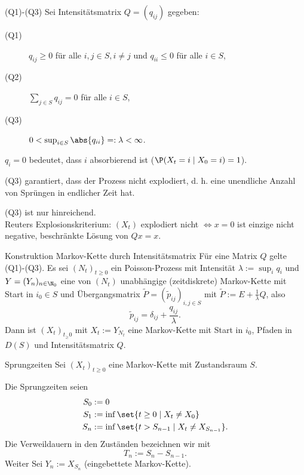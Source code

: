 \begin{karte}{(Q1)-(Q3)}
    Sei Intensitätsmatrix \( Q = (q_{ij}) \) gegeben:
    \begin{description}
        \item[(Q1)] \(q_{ij} \geq 0\) für alle \(i,j\in S,i\neq j\) 
        und \(q_{ii} \leq 0\) für alle \(i\in S\),
        \item[(Q2)] \(\sum_{j\in S} q_{ij} = 0\) für alle \(i\in S\),
        \item[(Q3)] \(0<\sup_{i\in S} \abs{q_{ii}} =: \lambda < \infty\). 
    \end{description}
    \(q_i = 0\) bedeutet, dass \(i\) absorbierend ist (\(\P(X_t = i \;|\;X_0 = i) = 1\)).

    (Q3) garantiert, dass der Prozess nicht explodiert, d. h. eine
    unendliche Anzahl von Sprüngen in endlicher Zeit hat.

    (Q3) ist nur hinreichend.\\
    Reuters Explosionskriterium: \((X_t)\) explodiert nicht 
    \(\Leftrightarrow x = 0\) ist einzige nicht negative, 
    beschränkte Lösung von \(Qx = x\).
\end{karte}

\begin{karte}{Konstruktion Markov-Kette durch Intensitätsmatrix}
    Für eine Matrix \(Q\) gelte (Q1)-(Q3). Es sei \((N_t)_{t\geq 0}\) 
    ein Poisson-Prozess mit Intensität \(\lambda := \sup_i q_i\) 
    und \(Y = (Y_n)_{n\in\N_0}\) eine von \((N_t)\) unabhängige 
    (zeitdiskrete) Markov-Kette mit Start in \(i_0 \in S\) und 
    Übergangsmatrix \(\tilde{P} = (\tilde{p}_{ij})_{i,j\in S}\) 
    mit \(\tilde{P} := E + \frac{1}{\lambda} Q\), also 
    \[ \tilde{p}_{ij} = \delta_{ij} + \frac{q_{ij}}{\lambda}. \]
    Dann ist \((X_t)_{t_\geq 0}\) mit \(X_t := Y_{N_t}\) eine 
    Markov-Kette mit Start in \(i_0\), Pfaden in \(D(S)\) und 
    Intensitätsmatrix \(Q\).
\end{karte}

\begin{karte}{Sprungzeiten}
    Sei \((X_t)_{t\geq 0}\) eine Markov-Kette mit Zustandsraum \(S\).

    Die Sprungzeiten seien 
    \begin{align*}
        S_0 &:= 0 \\
        S_1 &:= \inf \set{t\geq 0 \;|\; X_t \neq X_0 } \\
        S_n &:= \inf \set{t> S_{n-1} \;|\; X_t \neq X_{S_{n-1}}}.
    \end{align*}
    Die Verweildauern in den Zuständen bezeichnen wir mit 
    \[ T_n := S_n - S_{n-1}. \]
    Weiter Sei \(Y_n := X_{S_n}\) (eingebettete Markov-Kette).
\end{karte}

